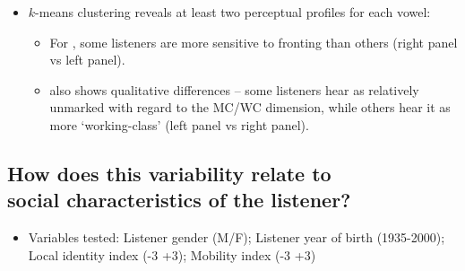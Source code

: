 \documentclass[a0,portrait]{a0poster}
\begin{document}
\begin{multicols}{3}
\begin{itemize}
\item{$k$-means clustering reveals at least two perceptual profiles for each vowel:\begin{itemize}\item{For , some listeners are more sensitive to fronting than others (right panel vs left panel).}\item{ also shows qualitative differences -- some listeners hear \textipa{[\o:]} as relatively unmarked with regard to the MC/WC dimension, while others hear it as more `working-class' (left panel vs right panel).}\end{itemize}}
\end{itemize}

\subsection*{How does this variability relate to \\ social characteristics of the listener?}
\begin{itemize}
\item{Variables tested: Listener gender (M/F); Listener year of birth (1935-2000); Local identity index (-3 +3); Mobility index (-3 +3)}
\end{itemize}
\vspace*{-1cm}

\end{multicols}
\end{document}
